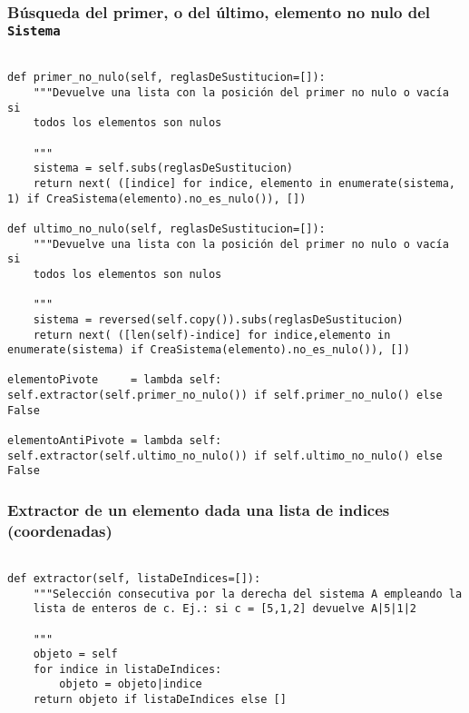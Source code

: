 \documentclass[11pt]{report}
\begin{document}
\subsubsection{Búsqueda del primer, o del último, elemento no nulo del \texttt{Sistema}}
\label{sec:org8b8131d}

\begin{verbatim}

def primer_no_nulo(self, reglasDeSustitucion=[]):
    """Devuelve una lista con la posición del primer no nulo o vacía si
    todos los elementos son nulos

    """
    sistema = self.subs(reglasDeSustitucion)
    return next( ([indice] for indice, elemento in enumerate(sistema, 1) if CreaSistema(elemento).no_es_nulo()), [])

def ultimo_no_nulo(self, reglasDeSustitucion=[]):
    """Devuelve una lista con la posición del primer no nulo o vacía si
    todos los elementos son nulos

    """
    sistema = reversed(self.copy()).subs(reglasDeSustitucion)
    return next( ([len(self)-indice] for indice,elemento in enumerate(sistema) if CreaSistema(elemento).no_es_nulo()), [])

elementoPivote     = lambda self: self.extractor(self.primer_no_nulo()) if self.primer_no_nulo() else False

elementoAntiPivote = lambda self: self.extractor(self.ultimo_no_nulo()) if self.ultimo_no_nulo() else False

\end{verbatim}

\subsubsection{Extractor de un elemento dada una lista de indices (coordenadas)}
\label{sec:orge29e76c}


\begin{verbatim}

def extractor(self, listaDeIndices=[]):
    """Selección consecutiva por la derecha del sistema A empleando la
    lista de enteros de c. Ej.: si c = [5,1,2] devuelve A|5|1|2

    """
    objeto = self
    for indice in listaDeIndices:
        objeto = objeto|indice
    return objeto if listaDeIndices else []

\end{verbatim}
\end{document}
